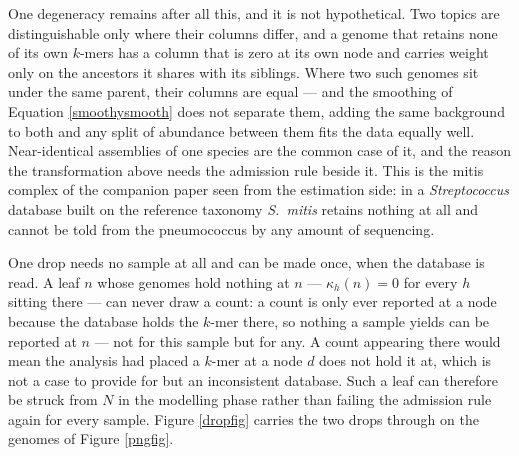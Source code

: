 \documentclass[pdflatex,sn-vancouver-num]{sn-jnl}
\begin{document}
    One degeneracy remains after all this, and it is not hypothetical. Two topics are
    distinguishable only where their columns differ, and a genome that retains none of its own
    $k$-mers has a column that is zero at its own node and carries weight only on the ancestors it
    shares with its siblings. Where two such genomes sit under the same parent, their columns are
    equal --- and the smoothing of Equation \eqref{smoothysmooth} does not separate them, adding the
    same background to both and any split of abundance
    between them fits the data equally well. Near-identical assemblies of one species are the common
    case of it, and the reason the transformation above needs the admission rule
    beside it. This is the mitis complex of the companion paper seen
    from the estimation side: in a \emph{Streptococcus} database built on the reference taxonomy
    \emph{S.~mitis} retains nothing at all and cannot be told from the pneumococcus by any amount of
    sequencing.

    One drop needs no sample at all and can be made once, when the database is read. A leaf $n$ whose
    genomes hold nothing at $n$ --- $\kappa_h(n) = 0$ for every $h$ sitting there --- can never draw a
    count: a count is only ever reported at a node because the
    database holds the $k$-mer there, so nothing a sample yields can be reported at $n$ --- not for
    this sample but for any. A count appearing there would mean the analysis had placed a $k$-mer at
    a node $d$ does not hold it at, which is not a case to provide for but an inconsistent database.
    Such a leaf can therefore be struck from $N$ in the modelling phase rather than failing the
    admission rule again for every sample. Figure \ref{dropfig} carries the two drops through on the
    genomes of Figure \ref{pngfig}.
\end{document}
